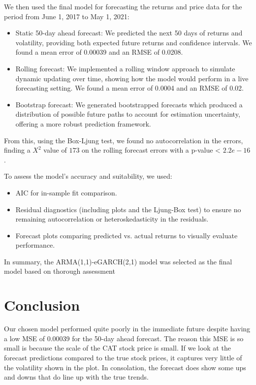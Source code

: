 \documentclass{article}
\begin{document}
 We then used the final model for forecasting the returns and price data for the period from June 1, 2017 to May 1, 2021:

 \begin{itemize}
	 \item Static 50-day ahead forecast: We predicted the next 50 days of returns and volatility, providing both expected future returns and confidence intervals. We found a mean error of 0.00039 and an RMSE of 0.0208.


	 \item Rolling forecast: We implemented a rolling window approach to simulate dynamic updating over time, showing how the model would perform in a live forecasting setting. We found a mean error of 0.0004 and an RMSE of 0.02.


	 \item Bootstrap forecast: We generated bootstrapped forecasts which produced a distribution of possible future paths to account for estimation uncertainty, offering a more robust prediction framework.
\end{itemize}

From this, using the Box-Ljung test, we found no autocorrelation in the errors, finding a $X^2$ value of $173$ on the rolling forecast errors with a p-value < $2.2e-16$. 

 To assess the model’s accuracy and suitability, we used:
 \begin{itemize}
\item AIC for in-sample fit comparison.


\item Residual diagnostics (including plots and the Ljung-Box test) to ensure no remaining autocorrelation or heteroskedasticity in the residuals.


\item Forecast plots comparing predicted vs. actual returns to visually evaluate performance.
\end{itemize}


In summary, the ARMA(1,1)-eGARCH(2,1) model was selected as the final model based on thorough assessment

\section{Conclusion}
Our chosen model performed quite poorly in the immediate future despite having a low MSE of 0.00039 for the 50-day ahead forecast.  The reason this MSE is so small is because the scale of the CAT stock price is small.  If we look at the forecast predictions compared to the true stock prices, it captures very little of the volatility shown in the plot.  In consolation, the forecast does show some ups and downs that do line up with the true trends.
\end{document}
